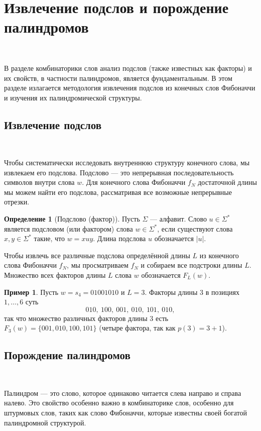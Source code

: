 \documentclass[a4paper,14pt]{extreport}
\theoremstyle{plain}
\theoremstyle{definition}
\newtheorem{definition}{Определение}[section]
\newtheorem{example}{Пример}
\theoremstyle{remark}
\begin{document}
\section{Извлечение подслов и порождение палиндромов}~\label{sec3.3}

В разделе комбинаторики слов анализ подслов (также известных как факторы) и их свойств, в частности палиндромов, является фундаментальным. В этом разделе излагается методология извлечения подслов из конечных слов Фибоначчи и изучения их палиндромической структуры.
\subsection{Извлечение подслов}~\label{sec3.3.1}

Чтобы систематически исследовать внутреннюю структуру конечного слова, мы извлекаем его подслова. Подслово --- это непрерывная последовательность символов внутри слова $w$. Для конечного слова Фибоначчи $f_N$ достаточной длины мы можем найти его подслова, рассматривая все возможные непрерывные отрезки.

\begin{definition}[Подслово (фактор)]
	Пусть $\Sigma$ --- алфавит. Слово $u \in \Sigma^*$ является подсловом (или фактором) слова $w \in \Sigma^*$, если существуют слова $x,y \in \Sigma^*$ такие, что $w = xuy$. Длина подслова $u$ обозначается $|u|$.
\end{definition}

Чтобы извлечь все различные подслова определённой длины $L$ из конечного слова Фибоначчи $f_N$, мы просматриваем $f_N$ и собираем все подстроки длины $L$. Множество всех факторов длины $L$ слова $w$ обозначается $F_L(w)$.

\begin{example}
	Пусть $w=s_4=01001010$ и $L=3$. Факторы длины $3$ в позициях $1,\dots,6$ суть
	\begin{equation}
		010,\ 100,\ 001,\ 010,\ 101,\ 010,
	\end{equation}
	так что множество различных факторов длины $3$ есть $F_3(w)=\{001,010,100,101\}$ (четыре фактора, так как $p(3)=3+1$).
\end{example}
\subsection{Порождение палиндромов}~\label{sec3.3.2}

Палиндром --- это слово, которое одинаково читается слева направо и справа налево. Это свойство особенно важно в комбинаторике слов, особенно для штурмовых слов, таких как слово Фибоначчи, которые известны своей богатой палиндромной структурой.
\end{document}

